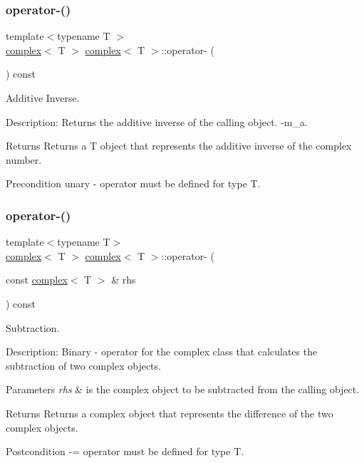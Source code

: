 \subsubsection{\texorpdfstring{operator-\/()}{operator-()}\hspace{0.1cm}{\footnotesize\ttfamily [1/2]}}
{\footnotesize\ttfamily template$<$typename T $>$ \\
\hyperlink{classcomplex}{complex}$<$ T $>$ \hyperlink{classcomplex}{complex}$<$ T $>$\+::operator-\/ (\begin{DoxyParamCaption}{ }\end{DoxyParamCaption}) const}



Additive Inverse. 

Description\+: Returns the additive inverse of the calling object. -\/m\+\_\+a. \begin{DoxyReturn}{Returns}
Returns a T object that represents the additive inverse of the complex number. 
\end{DoxyReturn}
\begin{DoxyPrecond}{Precondition}
unary -\/ operator must be defined for type T. 
\end{DoxyPrecond}
\mbox{\label{classcomplex_a7f61f4a380f418de039d1f65946424ef}} 
\subsubsection{\texorpdfstring{operator-\/()}{operator-()}\hspace{0.1cm}{\footnotesize\ttfamily [2/2]}}
{\footnotesize\ttfamily template$<$typename T$>$ \\
\hyperlink{classcomplex}{complex}$<$ T $>$ \hyperlink{classcomplex}{complex}$<$ T $>$\+::operator-\/ (\begin{DoxyParamCaption}\item[{const \hyperlink{classcomplex}{complex}$<$ T $>$ \&}]{rhs }\end{DoxyParamCaption}) const}



Subtraction. 

Description\+: Binary -\/ operator for the complex class that calculates the subtraction of two complex objects. 
\begin{DoxyParams}{Parameters}
{\em rhs} & is the complex object to be subtracted from the calling object. \\
\hline
\end{DoxyParams}
\begin{DoxyReturn}{Returns}
Returns a complex object that represents the difference of the two complex objects. 
\end{DoxyReturn}
\begin{DoxyPostcond}{Postcondition}
-\/= operator must be defined for type T. 
\end{DoxyPostcond}
\mbox{\label{classcomplex_a272e86ba6de2f88cb1803127f8ff0481}} 
